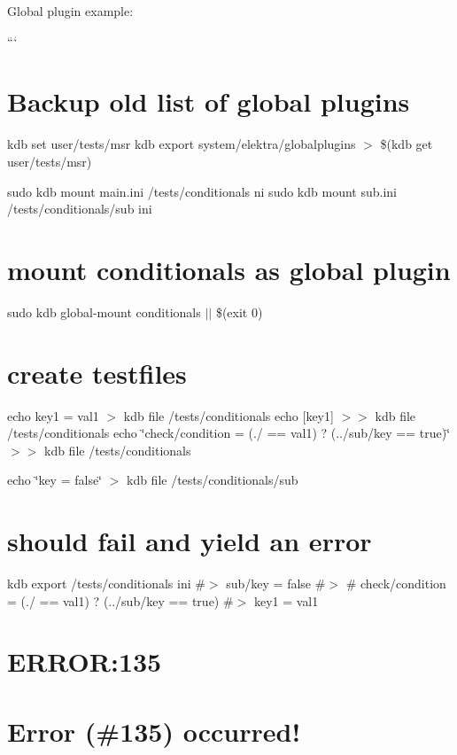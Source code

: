 Global plugin example\+:

``` \section*{Backup old list of global plugins}

kdb set user/tests/msr  kdb export system/elektra/globalplugins $>$ \$(kdb get user/tests/msr)

sudo kdb mount main.\+ini /tests/conditionals ni sudo kdb mount sub.\+ini /tests/conditionals/sub ini

\section*{mount conditionals as global plugin}

sudo kdb global-\/mount conditionals $\vert$$\vert$ \$(exit 0)

\section*{create testfiles}

echo \textquotesingle{}key1 = val1\textquotesingle{} $>$ {\ttfamily kdb file /tests/conditionals} echo \textquotesingle{}\mbox{[}key1\mbox{]}\textquotesingle{} $>$$>$ {\ttfamily kdb file /tests/conditionals} echo \char`\"{}check/condition = (./ == \textquotesingle{}val1\textquotesingle{}) ? (../sub/key == \textquotesingle{}true\textquotesingle{})\char`\"{} $>$$>$ {\ttfamily kdb file /tests/conditionals}

echo \char`\"{}key = false\char`\"{} $>$ {\ttfamily kdb file /tests/conditionals/sub}

\section*{should fail and yield an error}

kdb export /tests/conditionals ini \#$>$ sub/key = false \#$>$ \# check/condition = (./ == \textquotesingle{}val1\textquotesingle{}) ? (../sub/key == \textquotesingle{}true\textquotesingle{}) \#$>$ key1 = val1 \section*{E\+R\+R\+OR\+:135}

\section*{Error (\#135) occurred!}

